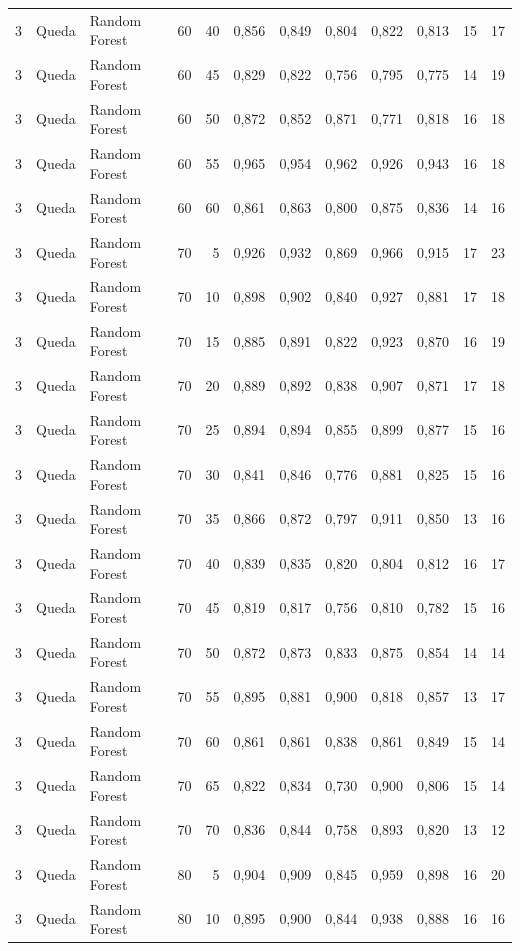\begin{longtable}{@{}rllrrrrrrrrr@{}}
3 & Queda & Random Forest & 60 & 40 & 0,856 & 0,849 & 0,804 & 0,822 & 0,813 & 15 & 17 \\
3 & Queda & Random Forest & 60 & 45 & 0,829 & 0,822 & 0,756 & 0,795 & 0,775 & 14 & 19 \\
3 & Queda & Random Forest & 60 & 50 & 0,872 & 0,852 & 0,871 & 0,771 & 0,818 & 16 & 18 \\
3 & Queda & Random Forest & 60 & 55 & 0,965 & 0,954 & 0,962 & 0,926 & 0,943 & 16 & 18 \\
3 & Queda & Random Forest & 60 & 60 & 0,861 & 0,863 & 0,800 & 0,875 & 0,836 & 14 & 16 \\
3 & Queda & Random Forest & 70 & 5 & 0,926 & 0,932 & 0,869 & 0,966 & 0,915 & 17 & 23 \\
3 & Queda & Random Forest & 70 & 10 & 0,898 & 0,902 & 0,840 & 0,927 & 0,881 & 17 & 18 \\
3 & Queda & Random Forest & 70 & 15 & 0,885 & 0,891 & 0,822 & 0,923 & 0,870 & 16 & 19 \\
3 & Queda & Random Forest & 70 & 20 & 0,889 & 0,892 & 0,838 & 0,907 & 0,871 & 17 & 18 \\
3 & Queda & Random Forest & 70 & 25 & 0,894 & 0,894 & 0,855 & 0,899 & 0,877 & 15 & 16 \\
3 & Queda & Random Forest & 70 & 30 & 0,841 & 0,846 & 0,776 & 0,881 & 0,825 & 15 & 16 \\
3 & Queda & Random Forest & 70 & 35 & 0,866 & 0,872 & 0,797 & 0,911 & 0,850 & 13 & 16 \\
3 & Queda & Random Forest & 70 & 40 & 0,839 & 0,835 & 0,820 & 0,804 & 0,812 & 16 & 17 \\
3 & Queda & Random Forest & 70 & 45 & 0,819 & 0,817 & 0,756 & 0,810 & 0,782 & 15 & 16 \\
3 & Queda & Random Forest & 70 & 50 & 0,872 & 0,873 & 0,833 & 0,875 & 0,854 & 14 & 14 \\
3 & Queda & Random Forest & 70 & 55 & 0,895 & 0,881 & 0,900 & 0,818 & 0,857 & 13 & 17 \\
3 & Queda & Random Forest & 70 & 60 & 0,861 & 0,861 & 0,838 & 0,861 & 0,849 & 15 & 14 \\
3 & Queda & Random Forest & 70 & 65 & 0,822 & 0,834 & 0,730 & 0,900 & 0,806 & 15 & 14 \\
3 & Queda & Random Forest & 70 & 70 & 0,836 & 0,844 & 0,758 & 0,893 & 0,820 & 13 & 12 \\
3 & Queda & Random Forest & 80 & 5 & 0,904 & 0,909 & 0,845 & 0,959 & 0,898 & 16 & 20 \\
3 & Queda & Random Forest & 80 & 10 & 0,895 & 0,900 & 0,844 & 0,938 & 0,888 & 16 & 16 \\

\end{longtable}
